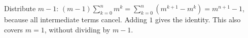 Distribute $m-1$: $(m-1)\sum_{k=0}^n m^k=\sum_{k=0}^n(m^{k+1}-m^k)=m^{n+1}-1$, because all intermediate terms cancel. Adding $1$ gives the identity. This also covers $m=1$, without dividing by $m-1$.

